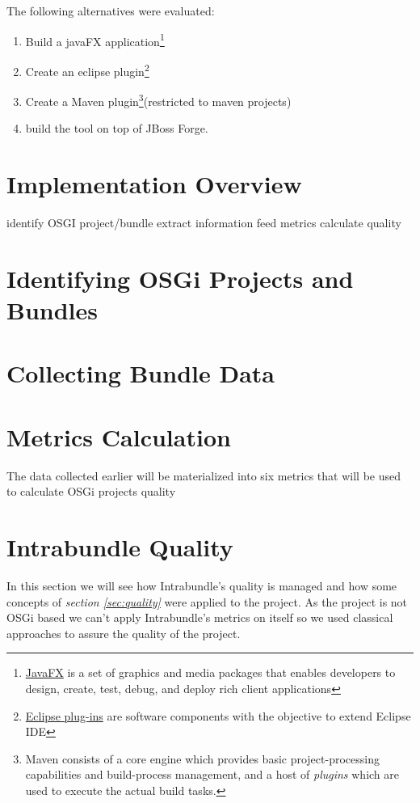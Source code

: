 The following alternatives were evaluated:

\begin{enumerate}
\item Build a javaFX application\footnote{\href{http://docs.oracle.com/javase/8/javase-clienttechnologies.htm}{JavaFX} is a set of graphics and media packages that enables developers to design, create, test, debug, and deploy rich client applications}
\item Create an eclipse plugin\footnote{\href{https://wiki.eclipse.org/FAQ_What_is_a_plug-in\%3F}{Eclipse plug-ins} are software components with the objective to extend Eclipse IDE}
\item Create a  Maven plugin\footnote{Maven consists of a core engine which provides basic project-processing capabilities and build-process management, and a host of \emph{plugins} which are used to execute the actual build tasks.}(restricted to maven projects)
\item build the tool on top of JBoss Forge.
\end{enumerate}



\section{Implementation Overview}
identify OSGI project/bundle
extract information
feed metrics
calculate quality

\section{Identifying OSGi Projects and Bundles}

\section{Collecting Bundle Data}

\section{Metrics Calculation}
The data collected earlier will be materialized into six metrics that will be used to calculate OSGi projects quality  

\section{Intrabundle Quality}
In this section we will see how Intrabundle's quality is managed and how some concepts of \textit{section \ref{sec:quality}} were applied to the project. As the project is not OSGi based we can't apply Intrabundle's metrics on itself so we used classical approaches to assure the quality of the project.

